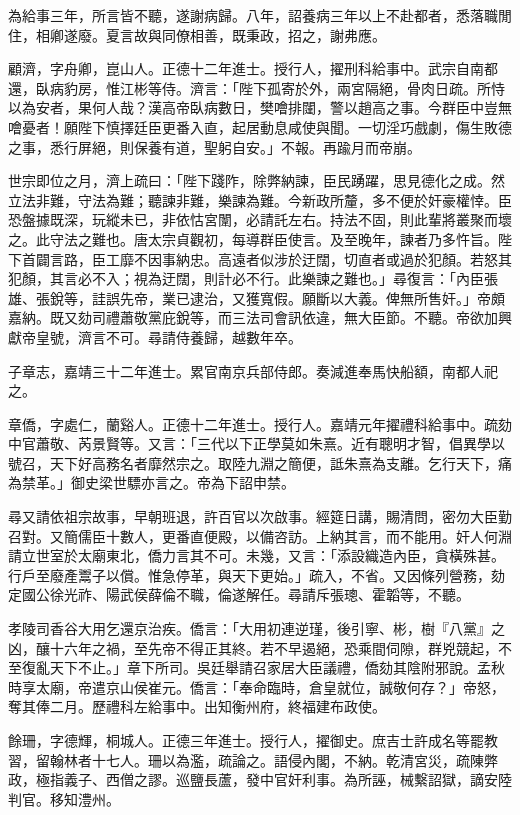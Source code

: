 \begin{pinyinscope}
為給事三年，所言皆不聽，遂謝病歸。八年，詔養病三年以上不赴都者，悉落職閒住，相卿遂廢。夏言故與同僚相善，既秉政，招之，謝弗應。

顧濟，字舟卿，崑山人。正德十二年進士。授行人，擢刑科給事中。武宗自南都還，臥病豹房，惟江彬等侍。濟言：「陛下孤寄於外，兩宮隔絕，骨肉日疏。所恃以為安者，果何人哉？漢高帝臥病數日，樊噲排闥，警以趙高之事。今群臣中豈無噲憂者！願陛下慎擇廷臣更番入直，起居動息咸使與聞。一切淫巧戲劇，傷生敗德之事，悉行屏絕，則保養有道，聖躬自安。」不報。再踰月而帝崩。

世宗即位之月，濟上疏曰：「陛下踐阼，除弊納諫，臣民踴躍，思見德化之成。然立法非難，守法為難；聽諫非難，樂諫為難。今新政所釐，多不便於奸豪權悻。臣恐盤據既深，玩縱未已，非依怙宮闈，必請託左右。持法不固，則此輩將叢聚而壞之。此守法之難也。唐太宗貞觀初，每導群臣使言。及至晚年，諫者乃多忤旨。陛下首闢言路，臣工靡不因事納忠。高遠者似涉於迂闊，切直者或過於犯顏。若怒其犯顏，其言必不入；視為迂闊，則計必不行。此樂諫之難也。」尋復言：「內臣張雄、張銳等，詿誤先帝，業已逮治，又獲寬假。願斷以大義。俾無所售奸。」帝頗嘉納。既又劾司禮蕭敬黨庇銳等，而三法司會訊依違，無大臣節。不聽。帝欲加興獻帝皇號，濟言不可。尋請侍養歸，越數年卒。

子章志，嘉靖三十二年進士。累官南京兵部侍郎。奏減進奉馬快船額，南都人祀之。

章僑，字處仁，蘭谿人。正德十二年進士。授行人。嘉靖元年擢禮科給事中。疏劾中官蕭敬、芮景賢等。又言：「三代以下正學莫如朱熹。近有聰明才智，倡異學以號召，天下好高務名者靡然宗之。取陸九淵之簡便，詆朱熹為支離。乞行天下，痛為禁革。」御史梁世驃亦言之。帝為下詔申禁。

尋又請依祖宗故事，早朝班退，許百官以次啟事。經筵日講，賜清問，密勿大臣勤召對。又簡儒臣十數人，更番直便殿，以備咨訪。上納其言，而不能用。奸人何淵請立世室於太廟東北，僑力言其不可。未幾，又言：「添設織造內臣，貪橫殊甚。行戶至廢產鬻子以償。惟急停革，與天下更始。」疏入，不省。又因條列營務，劾定國公徐光祚、陽武侯薛倫不職，倫遂解任。尋請斥張璁、霍韜等，不聽。

孝陵司香谷大用乞還京治疾。僑言：「大用初連逆瑾，後引寧、彬，樹『八黨』之凶，釀十六年之禍，至先帝不得正其終。若不早遏絕，恐乘間伺隙，群兇競起，不至復亂天下不止。」章下所司。吳廷舉請召家居大臣議禮，僑劾其陰附邪說。孟秋時享太廟，帝遣京山侯崔元。僑言：「奉命臨時，倉皇就位，誠敬何存？」帝怒，奪其俸二月。歷禮科左給事中。出知衡州府，終福建布政使。

餘珊，字德輝，桐城人。正德三年進士。授行人，擢御史。庶吉士許成名等罷教習，留翰林者十七人。珊以為濫，疏論之。語侵內閣，不納。乾清宮災，疏陳弊政，極指義子、西僧之謬。巡鹽長蘆，發中官奸利事。為所誣，械繫詔獄，謫安陸判官。移知澧州。


\end{pinyinscope}
